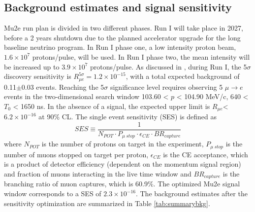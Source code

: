 \subsection{Background estimates and signal sensitivity}
Mu2e run plan is divided in two different phases. Run I 
will take place in 2027, before a 2 years shutdown due to the 
planned accelerator upgrade for the long baseline neutrino 
program. In Run I phase one, a low intensity proton beam, 
$1.6 \times 10^7$ protons/pulse, will be used. In Run I 
phase two, the mean intensity will be increased up to $3.9 \times 10^7$ 
protons/pulse. As discussed in \cite{universe9010054}, during Run I, the 5$\sigma$ discovery sensitivity is 
$R_{\mu e}^{5 \sigma} = 1.2 \times 10^{-15}$, with a 
total expected background of 0.11$\pm$0.03 events. 
Reaching the 5$\sigma$ significance level requires 
observing 5 $\mu\rightarrow e$ events in the two-dimensional search window 
103.60 < $p$ < 104.90 MeV/c, 640 < $T_0$ < 1650 ns. In the 
absence of a signal, the expected upper limit is $R_{\mu e}$<$6.2 \times 10^{-16}$
at 90\% CL. 
The single event sensitivity (SES) is defined as
\begin{equation}
    SES \equiv \frac{1}{N_{POT} \cdot P_{\mu \ stop} \cdot \epsilon_{CE} \cdot BR_{capture}}
\end{equation} 
where $N_{POT}$ is the number of protons on target in the experiment, 
$P_{\mu \ stop}$ is the number of muons stopped on target per 
proton, $\epsilon_{CE}$ is the CE acceptance, which is a product 
of detector efficiency (dependent on the momentum signal region) 
and fraction of muons interacting in the live time window and 
$BR_{capture}$ is the branching ratio of muon captures, which 
is 60.9\%. The optimized Mu2e signal window corresponds to a 
SES of $2.3 \times 10^{-16}$. The background estimates after 
the sensitivity optimization are summarized in Table \ref{tab:summarybkg}.

